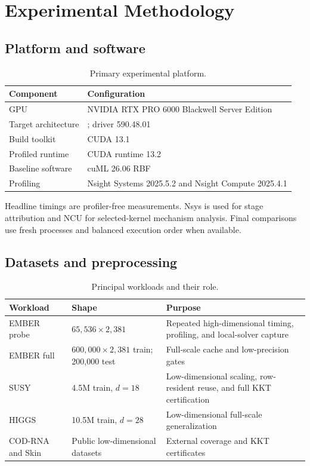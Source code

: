\section{Experimental Methodology}

\subsection{Platform and software}

\begin{table}[t]
  \centering
  \caption{Primary experimental platform.}
  \label{tab:platform}
  \begin{tabularx}{\textwidth}{@{}L{0.27\textwidth}Y@{}}
    \toprule
    Component & Configuration \\
    \midrule
    GPU & NVIDIA RTX PRO 6000 Blackwell Server Edition \\
    Target architecture & ; driver 590.48.01 \\
    Build toolkit & CUDA 13.1 \\
    Profiled runtime & CUDA runtime 13.2 \\
    Baseline software & cuML 26.06 RBF  \\
    Profiling & Nsight Systems 2025.5.2 and Nsight Compute 2025.4.1 \\
    \bottomrule
  \end{tabularx}
\end{table}

Headline timings are profiler-free  measurements. Nsys is
used for stage attribution and NCU for selected-kernel mechanism analysis.
Final comparisons use fresh processes and balanced execution order when
available.

\subsection{Datasets and preprocessing}

\begin{table}[t]
  \centering
  \caption{Principal workloads and their role.}
  \label{tab:workloads}
  \begin{tabularx}{\textwidth}{@{}L{0.20\textwidth}L{0.25\textwidth}Y@{}}
    \toprule
    Workload & Shape & Purpose \\
    \midrule
    EMBER probe & $65{,}536\times2{,}381$ & Repeated high-dimensional timing,
      profiling, and local-solver capture \\
    EMBER full & $600{,}000\times2{,}381$ train; 200,000 test & Full-scale
      cache and low-precision gates \\
    SUSY & 4.5M train, $d=18$ & Low-dimensional scaling, row-resident reuse,
      and full KKT certification \\
    HIGGS & 10.5M train, $d=28$ & Low-dimensional full-scale generalization \\
    COD-RNA and Skin & Public low-dimensional datasets & External coverage and
      KKT certificates \\
    \bottomrule
  \end{tabularx}
\end{table}

